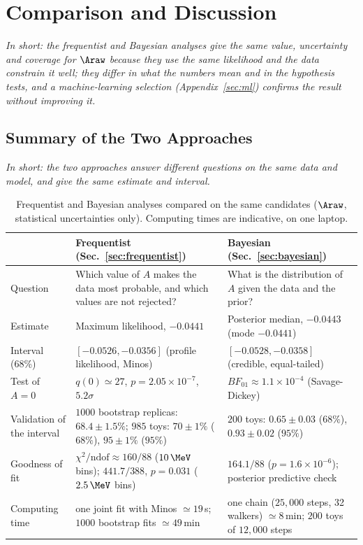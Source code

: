 \section{Comparison and Discussion}
\label{sec:comparison}
\emph{In short: the frequentist and Bayesian analyses give the same value, uncertainty and coverage for $\Araw$ because they use the same likelihood and the data constrain it well; they differ in what the numbers mean and in the hypothesis tests, and a machine-learning selection (Appendix~\ref{sec:ml}) confirms the result without improving it.}

\subsection{Summary of the Two Approaches}
\label{sec:comparison_summary}
\emph{In short: the two approaches answer different questions on the same data and model, and give the same estimate and interval.}
\begin{table}[t]
\centering
\small
\begin{tabular}{p{2.6cm}p{6.6cm}p{6.6cm}}
\toprule
 & Frequentist (Sec.~\ref{sec:frequentist}) & Bayesian (Sec.~\ref{sec:bayesian}) \\
\midrule
Question & Which value of $A$ makes the data most probable, and which values are not rejected? & What is the distribution of $A$ given the data and the prior? \\
Estimate & Maximum likelihood, $-0.0441$ & Posterior median, $-0.0443$ (mode $-0.0441$) \\
Interval (68\%) & $[-0.0526,-0.0356]$ (profile likelihood, Minos) & $[-0.0528,-0.0358]$ (credible, equal-tailed) \\
Test of $A=0$ & $q(0)\simeq27$, $p=2.05\times10^{-7}$, $5.2\sigma$ & $BF_{01}\approx1.1\times10^{-4}$ (Savage-Dickey) \\
Validation of the interval & $1000$ bootstrap replicas: $68.4\pm1.5\%$; $985$ toys: $70\pm1\%$ ($68\%$), $95\pm1\%$ ($95\%$) & $200$ toys: $0.65\pm0.03$ ($68\%$), $0.93\pm0.02$ ($95\%$) \\
Goodness of fit & $\chi^2/\mathrm{ndof}\approx160/88$ ($10\,\MeV$ bins); $441.7/388$, $p=0.031$ ($2.5\,\MeV$ bins) & $164.1/88$ ($p=1.6\times10^{-6}$); posterior predictive check \\
Computing time & one joint fit with Minos $\simeq19\,$s; $1000$ bootstrap fits $\simeq49\,$min & one chain ($25{,}000$ steps, 32 walkers) $\simeq8\,$min; $200$ toys of $12{,}000$ steps \\
\bottomrule
\end{tabular}
\caption{Frequentist and Bayesian analyses compared on the same candidates ($\Araw$, statistical uncertainties only). Computing times are indicative, on one laptop.}
\label{tab:comparison}
\end{table}

